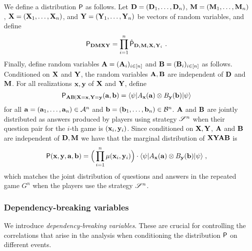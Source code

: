 We define a distribution $\P$ as follows. Let $\bD = (\bD_1,\ldots,\bD_n)$, $\bM = (\bM_1,\ldots,\bM_n)$, $\bX = (\bX_1,\ldots,\bX_n)$, and $\bY = (\bY_1,\ldots,\bY_n)$ be vectors of random variables, and define
\[
	\P_{\bD \bM \bX \bY} = \prod_{i=1}^n \hat{\P}_{\bD_i \bM_i \bX_i \bY_i}~.
\]
Finally, define random variables $\bA = (\bA_i)_{i \in [n]}$ and $\bB = (\bB_i)_{i \in [n]}$ as follows. Conditioned on $\bX$ and $\bY$, the random variables $\bA,\bB$ are independent of $\bD$ and $\bM$. For all realizations $\bx, \by$ of $\bX$ and $\bY$, define
\[
	\P_{\bA \bB | \bX = \bx, \bY = \by}(\ba,\bb) = \bra{\psi} A_\bx(\ba) \otimes B_\by(\bb) \ket{\psi}
\]
for all $\ba = (\ba_1,\ldots,\ba_n) \in \A^n$ and $\bb = (\bb_1,\ldots,\bb_n) \in \B^n$. $\bA$ and $\bB$ are jointly distributed as answers produced by players using strategy $\strategy^n$ when their question pair for the $i$-th game is $(\bx_i,\by_i)$. 
Since conditioned on $\bX, \bY$, $\bA$ and $\bB$ are independent of $\bD,\bM$ we have that the marginal distribution of $\bX \bY \bA \bB$ is
	\[
		\P(\bx,\by,\ba,\bb) = \Big ( \prod_{i=1}^n \mu(\bx_i,\by_i) \Big) \cdot \bra{\psi} A_\bx(\ba) \otimes B_\by(\bb) \ket{\psi}\;,
	\]
	which matches the joint distribution of questions and answers in the repeated game $G^n$ when the players use the strategy $\strategy^n$.

%
%
%	


\subsubsection{Dependency-breaking variables} 

 
We introduce \emph{dependency-breaking variables}. These are crucial for controlling the correlations that arise in the analysis when conditioning the  distribution $\P$ on different events. 

